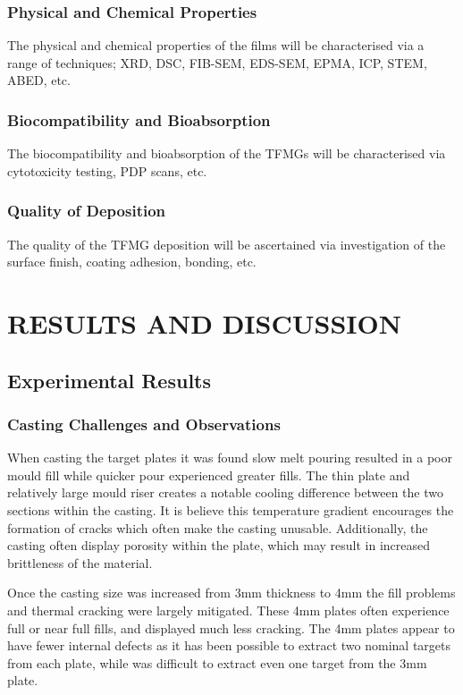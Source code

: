 \documentclass[a4paper,12pt,oneside]{report}%
\begin{document}
\subsection{Physical and Chemical Properties}
The physical and chemical properties of the films will be characterised via a range of techniques; XRD, DSC, FIB-SEM, EDS-SEM, EPMA, ICP, STEM, ABED, etc. 

\subsection{Biocompatibility and Bioabsorption} 
The biocompatibility and bioabsorption of the TFMGs will be characterised via cytotoxicity testing, PDP scans, etc.  

\subsection{Quality of Deposition} 
The quality of the TFMG deposition will be ascertained via investigation of the surface finish, coating adhesion, bonding, etc.

\chapter{RESULTS AND DISCUSSION}

\section{Experimental Results} 
\subsection{Casting Challenges and Observations}
When casting the target plates it was found slow melt pouring resulted in a poor mould fill while quicker pour experienced greater fills. The thin plate and relatively large mould riser creates a notable cooling difference between the two sections within the casting. It is believe this temperature gradient encourages the formation of cracks which often make the casting unusable. Additionally, the casting often display porosity within the plate, which may result in increased brittleness of the material. 

Once the casting size was increased from 3mm thickness to 4mm the fill problems and thermal cracking were largely mitigated. These 4mm plates often experience full or near full fills, and displayed much less cracking. The 4mm plates appear to have fewer internal defects as it has been possible to extract two nominal targets from each plate, while was difficult to extract even one target from the 3mm plate. 
\end{document}
